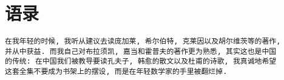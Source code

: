 \chapter{语录}
\begin{verbatim}
在我年轻的时候, 我听从建议去读庞加莱, 希尔伯特, 克莱因以及胡尔维茨等的著作,
并从中获益. 而我自己对布拉须凯, 嘉当和霍普夫的著作更为熟悉, 其实这也是中国
的传统: 在中国我们被教导要读孔夫子, 韩愈的散文以及杜甫的诗歌, 我真诚地希望
这套全集不要成为书架上的摆设, 而是在年轻数学家的手里被翻烂掉.
\end{verbatim}